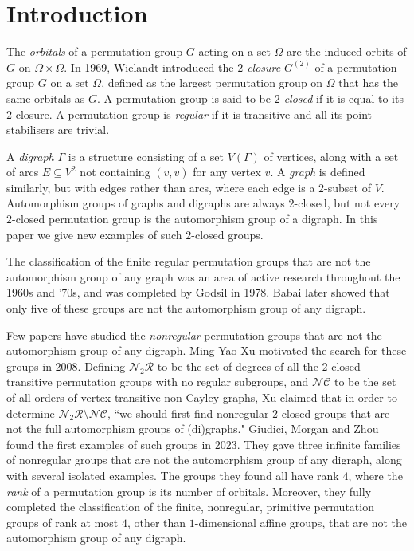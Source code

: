 
\section{Introduction}

The \emph{orbitals} of a permutation group $G$ acting on a set $\Omega$ are the induced orbits of $G$ on $\Omega \times \Omega$. In 1969, Wielandt \cite{ref:wielandt-invarient} introduced the \emph{$2$-closure} $G^{\left(2 \right)}$ of a permutation group $G$ on a set $\Omega$, defined as the largest permutation group on $\Omega$ that has the same orbitals as $G$. A permutation group is said to be \emph{$2$-closed} if it is equal to its $2$-closure. A permutation group is \emph{regular} if it is transitive and all its point stabilisers are trivial.

A \emph{digraph} $\Gamma$ is a structure consisting of a set $V{\left(\Gamma \right)}$ of vertices, along with a set of arcs $E \subseteq V^2$ not containing $\left(v, v \right)$ for any vertex $v$. A \emph{graph} is defined similarly, but with edges rather than arcs, where each edge is a $2$-subset of $V$. Automorphism groups of graphs and digraphs are always $2$-closed, but not every $2$-closed permutation group is the automorphism group of a digraph. In this paper we give new examples of such $2$-closed groups.

The classification of the finite regular permutation groups that are not the automorphism group of any graph was an area of active research throughout the 1960s and '70s, and was completed by Godsil \cite{ref:godsil-nonsolvable} in 1978. Babai \cite{ref:babai-drr} later showed that only five of these groups are not the automorphism group of any digraph.

Few papers have studied the \emph{nonregular} permutation groups that are not the automorphism group of any digraph. Ming-Yao Xu \cite{ref:xu-regular-subgroups} motivated the search for these groups in 2008. Defining $\mathcal{N}_2 \mathcal{R}$ to be the set of degrees of all the $2$-closed transitive permutation groups with no regular subgroups, and $\mathcal{NC}$ to be the set of all orders of vertex-transitive non-Cayley graphs, Xu claimed that in order to determine $\mathcal{N}_2 \mathcal{R} \setminus \mathcal{NC}$, ``we should first find nonregular 2-closed groups that are not the full automorphism groups of (di)graphs." Giudici, Morgan and Zhou \cite{ref:giudici-primitive} found the first examples of such groups in 2023. They gave three infinite families of nonregular groups that are not the automorphism group of any digraph, along with several isolated examples. The groups they found all have rank $4$, where the \emph{rank} of a permutation group is its number of orbitals. Moreover, they fully completed the classification of the finite, nonregular, primitive permutation groups of rank at most $4$, other than $1$-dimensional affine groups, that are not the automorphism group of any digraph.

